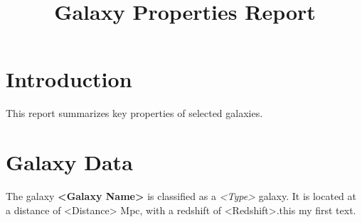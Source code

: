 \documentclass{article}
\title{Galaxy Properties Report}
\author{}
\date{}
\begin{document}
\maketitle

\section{Introduction}
This report summarizes key properties of selected galaxies.

\section{Galaxy Data}
The galaxy \textbf{<Galaxy Name>} is classified as a \textit{<Type>} galaxy. 
It is located at a distance of <Distance> Mpc, with a redshift of <Redshift>.this my first text.
\end{document}
